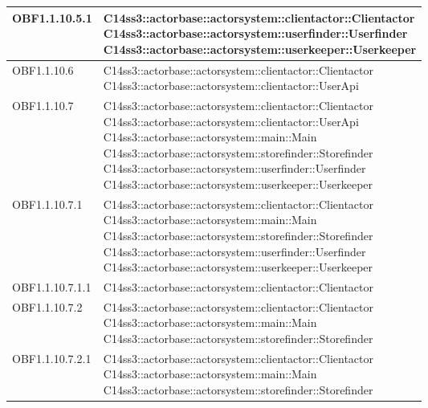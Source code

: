\documentclass{scalatekids-article}
\begin{document}
\begin{longtable}[H]{|p{4.5cm}|p{13cm}|}
\hline
OBF1.1.10.5.1 & \multiLineCell[t]{C14ss3::actorbase::actorsystem::clientactor::Clientactor\\C14ss3::actorbase::actorsystem::userfinder::Userfinder\\C14ss3::actorbase::actorsystem::userkeeper::Userkeeper\\}\\
\hline
OBF1.1.10.6 & \multiLineCell[t]{C14ss3::actorbase::actorsystem::clientactor::Clientactor\\C14ss3::actorbase::actorsystem::clientactor::UserApi\\}\\
\hline
OBF1.1.10.7 & \multiLineCell[t]{C14ss3::actorbase::actorsystem::clientactor::Clientactor\\C14ss3::actorbase::actorsystem::clientactor::UserApi\\C14ss3::actorbase::actorsystem::main::Main\\C14ss3::actorbase::actorsystem::storefinder::Storefinder\\C14ss3::actorbase::actorsystem::userfinder::Userfinder\\C14ss3::actorbase::actorsystem::userkeeper::Userkeeper\\}\\
\hline
OBF1.1.10.7.1 & \multiLineCell[t]{C14ss3::actorbase::actorsystem::clientactor::Clientactor\\C14ss3::actorbase::actorsystem::main::Main\\C14ss3::actorbase::actorsystem::storefinder::Storefinder\\C14ss3::actorbase::actorsystem::userfinder::Userfinder\\C14ss3::actorbase::actorsystem::userkeeper::Userkeeper\\}\\
\hline
OBF1.1.10.7.1.1 & \multiLineCell[t]{C14ss3::actorbase::actorsystem::clientactor::Clientactor\\}\\
\hline
OBF1.1.10.7.2 & \multiLineCell[t]{C14ss3::actorbase::actorsystem::clientactor::Clientactor\\C14ss3::actorbase::actorsystem::main::Main\\C14ss3::actorbase::actorsystem::storefinder::Storefinder\\}\\
\hline
OBF1.1.10.7.2.1 & \multiLineCell[t]{C14ss3::actorbase::actorsystem::clientactor::Clientactor\\C14ss3::actorbase::actorsystem::main::Main\\C14ss3::actorbase::actorsystem::storefinder::Storefinder\\}\\

\end{longtable}
\end{document}
